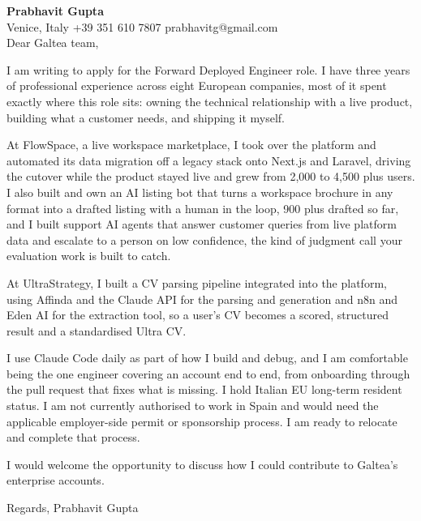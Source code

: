 \documentclass[a4paper,10.5pt]{article}
\begin{document}
\textbf{Prabhavit Gupta}\\
Venice, Italy \textbar{} +39 351 610 7807 \textbar{} prabhavitg@gmail.com\\[10pt]
Dear Galtea team,

I am writing to apply for the Forward Deployed Engineer role. I have three years of professional experience across eight European companies, most of it spent exactly where this role sits: owning the technical relationship with a live product, building what a customer needs, and shipping it myself.

At FlowSpace, a live workspace marketplace, I took over the platform and automated its data migration off a legacy stack onto Next.js and Laravel, driving the cutover while the product stayed live and grew from 2,000 to 4,500 plus users. I also built and own an AI listing bot that turns a workspace brochure in any format into a drafted listing with a human in the loop, 900 plus drafted so far, and I built support AI agents that answer customer queries from live platform data and escalate to a person on low confidence, the kind of judgment call your evaluation work is built to catch.

At UltraStrategy, I built a CV parsing pipeline integrated into the platform, using Affinda and the Claude API for the parsing and generation and n8n and Eden AI for the extraction tool, so a user's CV becomes a scored, structured result and a standardised Ultra CV.

I use Claude Code daily as part of how I build and debug, and I am comfortable being the one engineer covering an account end to end, from onboarding through the pull request that fixes what is missing. I hold Italian EU long-term resident status. I am not currently authorised to work in Spain and would need the applicable employer-side permit or sponsorship process. I am ready to relocate and complete that process.

I would welcome the opportunity to discuss how I could contribute to Galtea's enterprise accounts.

Regards,
Prabhavit Gupta
\end{document}
